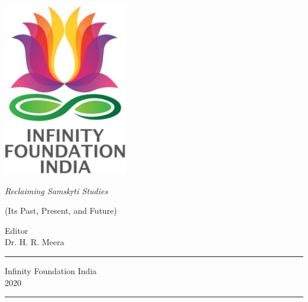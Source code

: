\thispagestyle{empty}
\begin{center}
\includegraphics[scale=0.3]{images/logo.png}
\bigskip

{\fontsize{10}{14}\selectfont\sl
Reclaiming Samskṛti Studies
}

\bigskip
\end{center}
\medskip

\begin{center}
{\fontsize{20}{24}\selectfont {Karnāṭaka Śāstrīya Saṅgīta}}

\small

(Its Past, Present, and Future)

\vfill


\bigskip
 
{\fontsize{14}{18}\selectfont 
Editor\\[3pt]
Dr. H. R. Meera}\par
\vfill

\rule{5cm}{1pt}

{\fontsize{12}{14}\selectfont
Infinity Foundation India\\[4pt]
2020}

\rule{5cm}{1pt}
\end{center}




